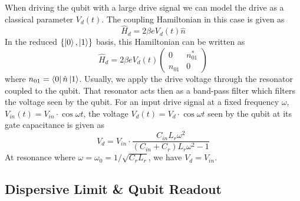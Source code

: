 When driving the qubit with a large drive signal we can model the drive as a classical parameter $V_d(t)$. The coupling Hamiltonian in this case is given as
%
\begin{equation}
\hat{H}_d = 2\beta e V_d(t) \hat{n}
\end{equation}
%
In the reduced $\{\left| 0 \right>,\left| 1 \right>\}$ basis, this Hamiltonian can be written as
%
\begin{equation}
\hat{H}_d = 2\beta e V_d(t)\left(\begin{array}{cc} 0 & n_{01}^* \\ n_{01} & 0 \end{array}\right) \label{eq:drive_hamiltonian}
\end{equation}
%
where $n_{01} = \left< 0 \right|\hat{n}\left| 1 \right>$. Usually, we apply the drive voltage through the resonator coupled to the qubit. That resonator acts then as a band-pass filter which filters the voltage seen by the qubit. For an input drive signal at a fixed frequency $\omega$, $V_{in}(t)=V_{in}\cdot\cos{\omega t}$, the voltage $V_d(t)=V_{d}\cdot\cos{\omega t}$ seen by the qubit at its gate capacitance is given as
%
\begin{equation}
V_d = V_{in}\cdot\frac{C_{in}L_r \omega^2}{(C_{in}+C_r)L_r\omega^2-1} \label{eq:qubit_drive_voltage}
\end{equation}
%
At resonance where $\omega=\omega_0=1/\sqrt{C_r L_r}$, we have $V_d = V_{in}$.

\subsection{Dispersive Limit \& Qubit Readout}

